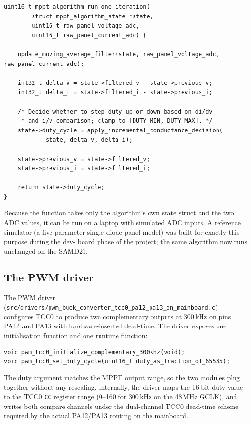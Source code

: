 \begin{lstlisting}[caption={Skeleton of the Incremental Conductance iteration.},label={lst:mppt}]
uint16_t mppt_algorithm_run_one_iteration(
        struct mppt_algorithm_state *state,
        uint16_t raw_panel_voltage_adc,
        uint16_t raw_panel_current_adc) {

    update_moving_average_filter(state, raw_panel_voltage_adc, raw_panel_current_adc);

    int32_t delta_v = state->filtered_v - state->previous_v;
    int32_t delta_i = state->filtered_i - state->previous_i;

    /* Decide whether to step duty up or down based on di/dv
     * and i/v comparison; clamp to [DUTY_MIN, DUTY_MAX]. */
    state->duty_cycle = apply_incremental_conductance_decision(
            state, delta_v, delta_i);

    state->previous_v = state->filtered_v;
    state->previous_i = state->filtered_i;

    return state->duty_cycle;
}
\end{lstlisting}

Because the function takes only the algorithm's own state struct
and the two ADC values, it can be run on a laptop with simulated
ADC inputs. A reference simulator (a five-parameter single-diode
panel model) was built for exactly this purpose during the dev-
board phase of the project; the same algorithm now runs unchanged
on the SAMD21.

\subsection{The PWM driver}

The PWM driver
(\texttt{src/drivers/pwm\_buck\_converter\_tcc0\_pa12\_pa13\_on\_mainboard.c})
configures TCC0 to produce two complementary outputs at 300\,kHz
on pins PA12 and PA13 with hardware-inserted dead-time. The
driver exposes one initialisation function and one runtime
function:

\begin{lstlisting}
void pwm_tcc0_initialize_complementary_300khz(void);
void pwm_tcc0_set_duty_cycle(uint16_t duty_as_fraction_of_65535);
\end{lstlisting}

The duty argument matches the MPPT output range, so the two modules
plug together without any rescaling. Internally, the driver maps
the 16-bit duty value to the TCC0 \texttt{CC} register range
(0--160 for 300\,kHz on the 48\,MHz GCLK), and writes both compare
channels under the dual-channel TCC0 dead-time scheme required by
the actual PA12/PA13 routing on the mainboard.

